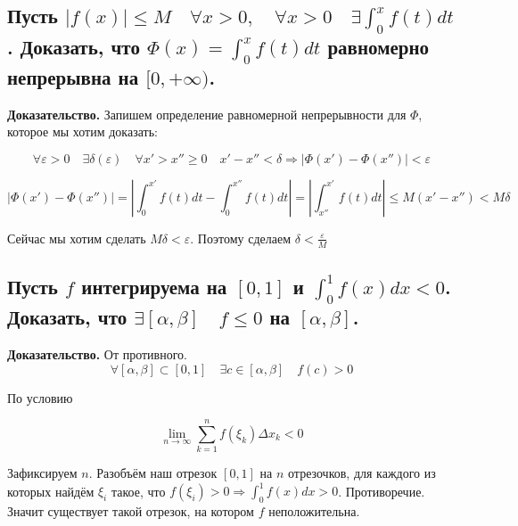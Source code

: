 \documentclass[a4paper]{article}
\begin{document}
\subsection{Пусть $|f(x)| \leq M \quad \forall x > 0, \quad \forall x > 0 \quad \exists \int_0^x f(t)dt$. Доказать, что $\Phi(x) = \int_0^x f(t)dt$ равномерно непрерывна на $[0, +\infty)$.}

\textbf{Доказательство.}
Запишем определение равномерной непрерывности для $\Phi$, которое мы хотим доказать:

\[
\forall \varepsilon > 0 \quad \exists \delta(\varepsilon) \quad \forall x' > x'' \geq 0 \quad x'-x''<\delta \Rightarrow |\Phi(x') - \Phi(x'')| < \varepsilon
\]

\[
|\Phi(x') - \Phi(x'')| = \left| \int_0^{x'} f(t)dt - \int_0^{x''} f(t)dt \right| = \left| \int_{x''}^{x'} f(t)dt \right| \leq M(x'-x'') < M\delta 
\]

Сейчас мы хотим сделать $M\delta < \varepsilon$. Поэтому сделаем $\delta < \frac{\varepsilon}{M}$

\subsection{Пусть $f$ интегрируема на $[0,1]$ и $\int_0^1 f(x)dx < 0$. Доказать, что $\exists [\alpha, \beta] \quad f \leq 0$ на $[\alpha, \beta]$.}

\textbf{Доказательство.} От противного. 
\[ \forall [\alpha, \beta] \subset [0,1] \quad \exists c \in [\alpha, \beta] \quad f(c) > 0\]

По условию 

\[ \lim_{n \rightarrow \infty} \sum_{k=1}^n f(\xi_k) \Delta x_k < 0
\]

Зафиксируем $n$. Разобъём наш отрезок $[0,1]$ на $n$ отрезочков, для каждого из которых найдём $\xi_i$ такое, что $f(\xi_i) > 0 \Rightarrow \int_0^1 f(x)dx > 0$. Противоречие. Значит существует такой отрезок, на котором $f$ неположительна.
\end{document}
